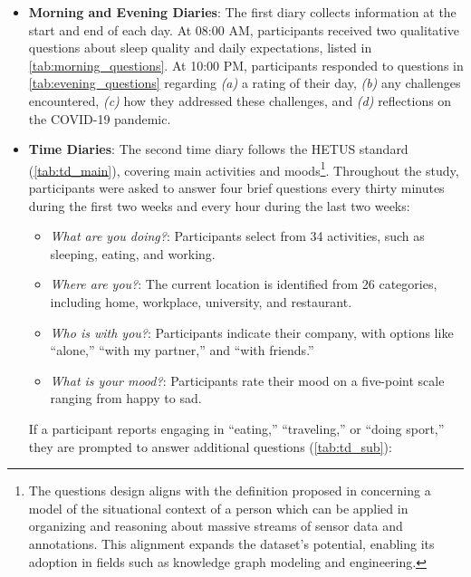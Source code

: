 \begin{itemize}
%
\item \textbf{Morning and Evening Diaries}: The first diary collects information at the start and end of each day. At 08:00 AM, participants received two qualitative questions about sleep quality and daily expectations, listed in \cref{tab:morning_questions}. At 10:00 PM, participants responded to questions in \cref{tab:evening_questions} regarding \textit{(a)} a rating of their day, \textit{(b)} any challenges encountered, \textit{(c)} how they addressed these challenges, and \textit{(d)} reflections on the COVID-19 pandemic.
%
\item \textbf{Time Diaries}: The second time diary follows the HETUS standard (\cref{tab:td_main}), covering main activities and moods\footnote{The questions design aligns with the definition proposed in \cite{li2022representing, giunchiglia2022context} concerning a model of the situational context of a person which can be applied in organizing and reasoning about massive streams of sensor data and annotations. This alignment expands the dataset’s potential, enabling its adoption in fields such as knowledge graph modeling and engineering.}. Throughout the study, participants were asked to answer four brief questions every thirty minutes during the first two weeks and every hour during the last two weeks:
%
\begin{itemize}
     \item \textit{What are you doing?}: Participants select from 34 activities, such as sleeping, eating, and working.
     \item \textit{Where are you?}: The current location is identified from 26 categories, including home, workplace, university, and restaurant.
     \item \textit{Who is with you?}: Participants indicate their company, with options like ``alone,'' ``with my partner,'' and ``with friends.''
     \item \textit{What is your mood?}: Participants rate their mood on a five-point scale ranging from happy to sad.
\end{itemize}
If a participant reports engaging in ``eating,'' ``traveling,'' or ``doing sport,'' they are prompted to answer additional questions (\cref{tab:td_sub}):


\end{itemize}
